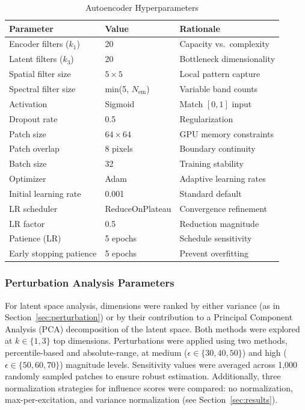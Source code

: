 \begin{table}[!t]
\centering
\caption{Autoencoder Hyperparameters}
\label{tab:hyperparams}
\begin{tabular}{@{}lll@{}}
\toprule
\textbf{Parameter} & \textbf{Value} & \textbf{Rationale} \\
\midrule
Encoder filters ($k_1$) & 20 & Capacity vs.~complexity \\
Latent filters ($k_3$) & 20 & Bottleneck dimensionality \\
Spatial filter size & $5 \times 5$ & Local pattern capture \\
Spectral filter size & min(5, $N_{\text{em}}$) & Variable band counts \\
Activation & Sigmoid & Match $[0,1]$ input \\
Dropout rate & 0.5 & Regularization \\
Patch size & $64 \times 64$ & GPU memory constraints \\
Patch overlap & 8 pixels & Boundary continuity \\
Batch size & 32 & Training stability \\
Optimizer & Adam~\cite{kingma2014adam} & Adaptive learning rates \\
Initial learning rate & 0.001 & Standard default \\
LR scheduler & ReduceOnPlateau & Convergence refinement \\
LR factor & 0.5 & Reduction magnitude \\
Patience (LR) & 5 epochs & Schedule sensitivity \\
Early stopping patience & 5 epochs & Prevent overfitting \\
\bottomrule
\end{tabular}
\end{table}

\subsubsection{Perturbation Analysis Parameters}
For latent space analysis, dimensions were ranked by either variance (as in Section~\ref{sec:perturbation}) or by their contribution to a Principal Component Analysis (PCA) decomposition of the latent space.
Both methods were explored at $k \in \{1, 3\}$ top dimensions. Perturbations were applied using two methods, percentile-based and absolute-range, at medium ($\epsilon \in \{30, 40, 50\}$) and high ($\epsilon \in \{50, 60, 70\}$) magnitude levels.
Sensitivity values were averaged across 1,000 randomly sampled patches to ensure robust estimation.
Additionally, three normalization strategies for influence scores were compared: no normalization, max-per-excitation, and variance normalization (see Section~\ref{sec:results}).

